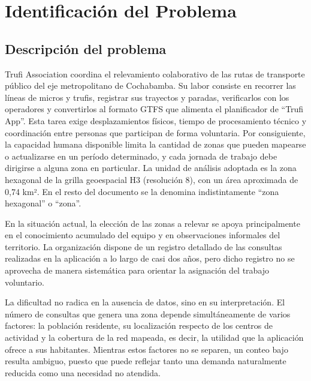 \chapter{Identificación del Problema}
\label{cap:problema}

\section{Descripción del problema}
\label{sec:descripcion-problema}

Trufi Association coordina el relevamiento colaborativo de las rutas de transporte público
del eje metropolitano de Cochabamba. Su labor consiste en recorrer las líneas de micros y
trufis, registrar sus trayectos y paradas, verificarlos con los operadores y convertirlos
al formato GTFS que alimenta el planificador de ``Trufi App''. Esta tarea exige
desplazamientos físicos, tiempo de procesamiento técnico y coordinación entre personas que
participan de forma voluntaria. Por consiguiente, la capacidad humana disponible limita la
cantidad de zonas que pueden mapearse o actualizarse en un período determinado, y cada
jornada de trabajo debe dirigirse a alguna zona en particular. La unidad de análisis
adoptada es la zona hexagonal de la grilla geoespacial H3 (resolución 8), con un área
aproximada de 0,74 km². En el resto del documento se la denomina indistintamente ``zona
hexagonal'' o ``zona''.

En la situación actual, la elección de las zonas a relevar se apoya principalmente en el
conocimiento acumulado del equipo y en observaciones informales del territorio. La
organización dispone de un registro detallado de las consultas realizadas en la aplicación
a lo largo de casi dos años, pero dicho registro no se aprovecha de manera sistemática para
orientar la asignación del trabajo voluntario.

La dificultad no radica en la ausencia de datos, sino en su interpretación. El número de
consultas que genera una zona depende simultáneamente de varios factores: la población
residente, su localización respecto de los centros de actividad y la cobertura de la red
mapeada, es decir, la utilidad que la aplicación ofrece a sus habitantes. Mientras estos factores no se separen, un conteo bajo resulta
ambiguo, puesto que puede reflejar tanto una demanda naturalmente reducida como una
necesidad no atendida.

